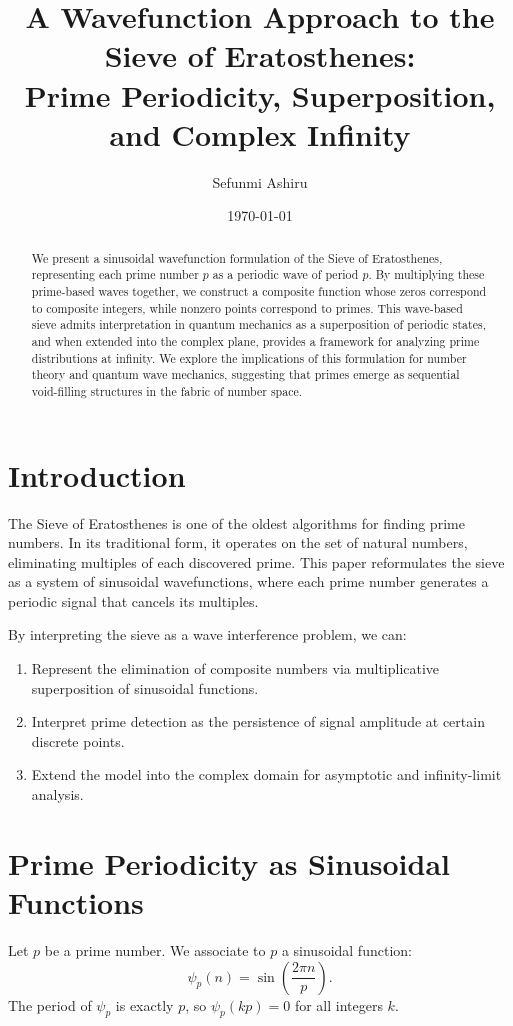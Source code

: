 \documentclass[12pt]{article}
\title{A Wavefunction Approach to the Sieve of Eratosthenes:\\
Prime Periodicity, Superposition, and Complex Infinity}
\author{Sefunmi Ashiru}
\date{\today}
\begin{document}
\maketitle

\begin{abstract}
We present a sinusoidal wavefunction formulation of the Sieve of Eratosthenes, representing each prime number $p$ as a periodic wave of period $p$. By multiplying these prime-based waves together, we construct a composite function whose zeros correspond to composite integers, while nonzero points correspond to primes. This wave-based sieve admits interpretation in quantum mechanics as a superposition of periodic states, and when extended into the complex plane, provides a framework for analyzing prime distributions at infinity. We explore the implications of this formulation for number theory and quantum wave mechanics, suggesting that primes emerge as sequential void-filling structures in the fabric of number space.
\end{abstract}

\section{Introduction}
The Sieve of Eratosthenes is one of the oldest algorithms for finding prime numbers. In its traditional form, it operates on the set of natural numbers, eliminating multiples of each discovered prime. This paper reformulates the sieve as a system of sinusoidal wavefunctions, where each prime number generates a periodic signal that cancels its multiples.

By interpreting the sieve as a wave interference problem, we can:
\begin{enumerate}
    \item Represent the elimination of composite numbers via multiplicative superposition of sinusoidal functions.
    \item Interpret prime detection as the persistence of signal amplitude at certain discrete points.
    \item Extend the model into the complex domain for asymptotic and infinity-limit analysis.
\end{enumerate}

\section{Prime Periodicity as Sinusoidal Functions}
Let $p$ be a prime number. We associate to $p$ a sinusoidal function:
\begin{equation}
\psi_p(n) = \sin\left( \frac{2\pi n}{p} \right).
\end{equation}
The period of $\psi_p$ is exactly $p$, so $\psi_p(kp) = 0$ for all integers $k$.
\end{document}
